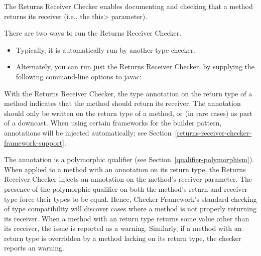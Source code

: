 \htmlhr
{}

The Returns Receiver Checker enables documenting and checking that a method
returns its receiver (i.e., the \<this> parameter).

There are two ways to run the Returns Receiver Checker.
\begin{itemize}
\item
Typically, it is automatically run by another type checker.
\item
Alternately, you can run just the Returns Receiver Checker, by
supplying the following command-line options to javac:
\end{itemize}



With the Returns Receiver Checker, the type annotation
 on the return type of a method
indicates that the method should return its receiver.  The
 annotation should only be written
on the return type of a method, or (in rare cases) as part of a downcast.  When
using certain frameworks for the builder pattern,
 annotations will be injected
automatically; see Section~\ref{returns-receiver-checker-framework-support}. 



The  annotation is a polymorphic
qualifier (see Section~\ref{qualifier-polymorphism}).  When applied to a method
with an  annotation on its return
type, the Returns Receiver Checker injects an
 annotation on the method's receiver
parameter.  The presence of the polymorphic
 qualifier on both the method's
return and receiver type force their types to be equal.  Hence, Checker
Framework's standard checking of type compatibility will discover cases where a
method is not properly returning its receiver.  When a method with an
 return type returns some value
other than its receiver, the issue is reported as a
 warning.  Similarly, if a method with an
 return type is overridden by a
method lacking  on its return type,
the checker reports an  warning.

